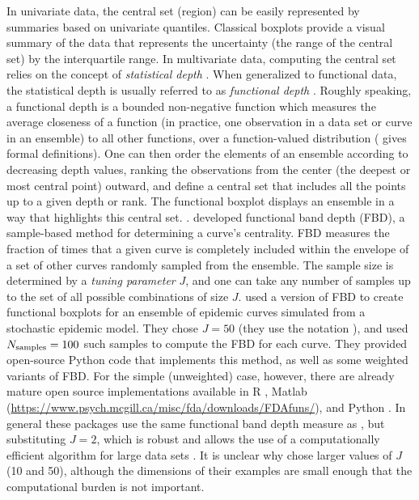 \documentclass[fleqn,10pt,lineno]{wlpeerj}
\begin{document}
In univariate data, the central set (region) can be easily represented by summaries based on univariate quantiles. Classical boxplots provide a visual summary of the data that represents the uncertainty (the range of the central set) by the interquartile range. In multivariate data, computing the central set relies on the concept of \emph{statistical depth} \citep{mahalanobis1936generalized, tukey1975mathematics, oja1983descriptive, liu1990notion, singh1991notion, vardi2000multivariate, zuo2003projection}. When generalized to functional data, the statistical depth is usually referred to as \emph{functional depth} \citep{fraiman2001trimmed}.
Roughly speaking, a functional depth is a bounded non-negative function which measures the average closeness of a function (in practice, one observation in a data set or curve in an ensemble) to all other functions, over a function-valued distribution (\citep{zuo2000general} gives formal definitions). 
One can then order the elements of an ensemble according to decreasing depth values, ranking the observations from the center (the deepest or most central point) outward, and define a central set that includes all the points up to a given depth or rank. The functional boxplot displays an ensemble in a way that highlights this central set. \citep{sun2011functional,sun2012exact}.
 \cite{lopez2007depth} developed functional band depth (FBD), a sample-based method for determining a curve's centrality. FBD measures the fraction of times that a given curve is completely included within the envelope of a set of other curves randomly sampled from the ensemble. The sample size is determined by a \emph{tuning parameter} $J$, and one can take any number of samples up to the set of all possible combinations of size $J$. \juul used a version of FBD to create functional boxplots for an ensemble of epidemic curves simulated from a stochastic epidemic model. They chose $J=50$ (they use the notation \ncurve), and used $N_{\textrm{samples}}=100$ such samples to compute the FBD for each curve. They provided open-source Python code that implements this method, as well as some weighted variants of FBD. For the simple (unweighted) case, however, there are already mature open source implementations available in R \citep{fda_pkg,roahd}, Matlab (\url{https://www.psych.mcgill.ca/misc/fda/downloads/FDAfuns/}), and Python \citep{seabold2010statsmodels}. In general these packages use the same functional band depth measure as \juul, but substituting $J=2$, which is robust \citep{lopez2009concept} and allows the use of a computationally efficient algorithm for large data sets \citep{sun2012exact}. It is unclear why \juul chose larger values of $J$ (10 and 50), although the dimensions of their examples are small enough that the computational burden is not important.
\end{document}

